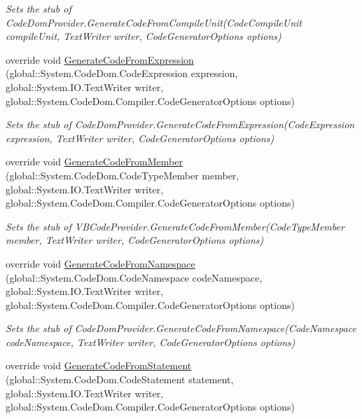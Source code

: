 \begin{DoxyCompactItemize}
\begin{DoxyCompactList}\small\item\em Sets the stub of Code\-Dom\-Provider.\-Generate\-Code\-From\-Compile\-Unit(\-Code\-Compile\-Unit compile\-Unit, Text\-Writer writer, Code\-Generator\-Options options)\end{DoxyCompactList}\item 
override void \hyperlink{class_microsoft_1_1_visual_basic_1_1_fakes_1_1_stub_v_b_code_provider_a7b32cd1dcb3afbe27c3ffd0c89a6c0b3}{Generate\-Code\-From\-Expression} (global\-::\-System.\-Code\-Dom.\-Code\-Expression expression, global\-::\-System.\-I\-O.\-Text\-Writer writer, global\-::\-System.\-Code\-Dom.\-Compiler.\-Code\-Generator\-Options options)
\begin{DoxyCompactList}\small\item\em Sets the stub of Code\-Dom\-Provider.\-Generate\-Code\-From\-Expression(\-Code\-Expression expression, Text\-Writer writer, Code\-Generator\-Options options)\end{DoxyCompactList}\item 
override void \hyperlink{class_microsoft_1_1_visual_basic_1_1_fakes_1_1_stub_v_b_code_provider_abdcd44d936a4981b669f153d19d0682d}{Generate\-Code\-From\-Member} (global\-::\-System.\-Code\-Dom.\-Code\-Type\-Member member, global\-::\-System.\-I\-O.\-Text\-Writer writer, global\-::\-System.\-Code\-Dom.\-Compiler.\-Code\-Generator\-Options options)
\begin{DoxyCompactList}\small\item\em Sets the stub of V\-B\-Code\-Provider.\-Generate\-Code\-From\-Member(\-Code\-Type\-Member member, Text\-Writer writer, Code\-Generator\-Options options)\end{DoxyCompactList}\item 
override void \hyperlink{class_microsoft_1_1_visual_basic_1_1_fakes_1_1_stub_v_b_code_provider_a084292b3590f2a271c3133a57d21a44f}{Generate\-Code\-From\-Namespace} (global\-::\-System.\-Code\-Dom.\-Code\-Namespace code\-Namespace, global\-::\-System.\-I\-O.\-Text\-Writer writer, global\-::\-System.\-Code\-Dom.\-Compiler.\-Code\-Generator\-Options options)
\begin{DoxyCompactList}\small\item\em Sets the stub of Code\-Dom\-Provider.\-Generate\-Code\-From\-Namespace(\-Code\-Namespace code\-Namespace, Text\-Writer writer, Code\-Generator\-Options options)\end{DoxyCompactList}\item 
override void \hyperlink{class_microsoft_1_1_visual_basic_1_1_fakes_1_1_stub_v_b_code_provider_a7a7aeadc2db0e73ba8920365c8b5c70f}{Generate\-Code\-From\-Statement} (global\-::\-System.\-Code\-Dom.\-Code\-Statement statement, global\-::\-System.\-I\-O.\-Text\-Writer writer, global\-::\-System.\-Code\-Dom.\-Compiler.\-Code\-Generator\-Options options)

\end{DoxyCompactItemize}
